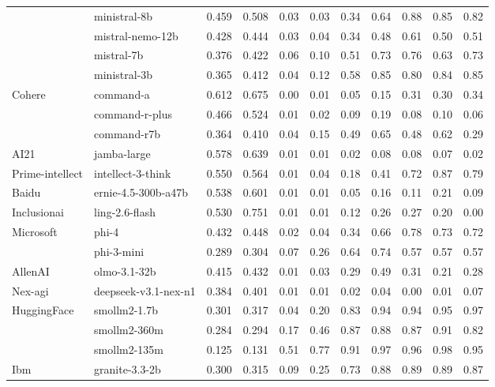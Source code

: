 \begin{longtable}{@{}ll rr rrrrrrr@{}}
 & ministral-8b & 0.459 & 0.508 & 0.03 & 0.03 & 0.34 & 0.64 & 0.88 & 0.85 & 0.82 \\
 & mistral-nemo-12b & 0.428 & 0.444 & 0.03 & 0.04 & 0.34 & 0.48 & 0.61 & 0.50 & 0.51 \\
 & mistral-7b & 0.376 & 0.422 & 0.06 & 0.10 & 0.51 & 0.73 & 0.76 & 0.63 & 0.73 \\
 & ministral-3b & 0.365 & 0.412 & 0.04 & 0.12 & 0.58 & 0.85 & 0.80 & 0.84 & 0.85 \\
Cohere & command-a & 0.612 & 0.675 & 0.00 & 0.01 & 0.05 & 0.15 & 0.31 & 0.30 & 0.34 \\
 & command-r-plus & 0.466 & 0.524 & 0.01 & 0.02 & 0.09 & 0.19 & 0.08 & 0.10 & 0.06 \\
 & command-r7b & 0.364 & 0.410 & 0.04 & 0.15 & 0.49 & 0.65 & 0.48 & 0.62 & 0.29 \\
AI21 & jamba-large & 0.578 & 0.639 & 0.01 & 0.01 & 0.02 & 0.08 & 0.08 & 0.07 & 0.02 \\
Prime-intellect & intellect-3-think & 0.550 & 0.564 & 0.01 & 0.04 & 0.18 & 0.41 & 0.72 & 0.87 & 0.79 \\
Baidu & ernie-4.5-300b-a47b & 0.538 & 0.601 & 0.01 & 0.01 & 0.05 & 0.16 & 0.11 & 0.21 & 0.09 \\
Inclusionai & ling-2.6-flash & 0.530 & 0.751 & 0.01 & 0.01 & 0.12 & 0.26 & 0.27 & 0.20 & 0.00 \\
Microsoft & phi-4 & 0.432 & 0.448 & 0.02 & 0.04 & 0.34 & 0.66 & 0.78 & 0.73 & 0.72 \\
 & phi-3-mini & 0.289 & 0.304 & 0.07 & 0.26 & 0.64 & 0.74 & 0.57 & 0.57 & 0.57 \\
AllenAI & olmo-3.1-32b & 0.415 & 0.432 & 0.01 & 0.03 & 0.29 & 0.49 & 0.31 & 0.21 & 0.28 \\
Nex-agi & deepseek-v3.1-nex-n1 & 0.384 & 0.401 & 0.01 & 0.01 & 0.02 & 0.04 & 0.00 & 0.01 & 0.07 \\
HuggingFace & smollm2-1.7b & 0.301 & 0.317 & 0.04 & 0.20 & 0.83 & 0.94 & 0.94 & 0.95 & 0.97 \\
 & smollm2-360m & 0.284 & 0.294 & 0.17 & 0.46 & 0.87 & 0.88 & 0.87 & 0.91 & 0.82 \\
 & smollm2-135m & 0.125 & 0.131 & 0.51 & 0.77 & 0.91 & 0.97 & 0.96 & 0.98 & 0.95 \\
Ibm & granite-3.3-2b & 0.300 & 0.315 & 0.09 & 0.25 & 0.73 & 0.88 & 0.89 & 0.89 & 0.87 \\
\end{longtable}

